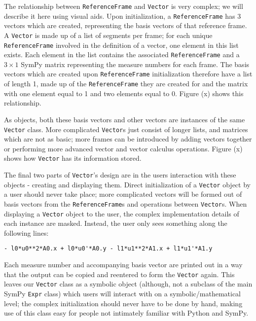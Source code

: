\documentclass[twocolumn,10pt]{asme2e}
\begin{document}
The relationship between \verb|ReferenceFrame| and \verb|Vector| is very
complex; we will describe it here using visual aids.
Upon initialization, a \verb|ReferenceFrame| has 3 vectors which are created,
representing the basis vectors of that reference frame.
A \verb|Vector| is made up of a list of segments per frame; for each unique
\verb|ReferenceFrame| involved in the definition of a vector, one element in
this list exists.
Each element in the list contains the associated \verb|ReferenceFrame| and a
$3\times1$ SymPy matrix representing the measure numbers for each frame.
The basis vectors which are created upon \verb|ReferenceFrame| initialization
therefore have a list of length 1, made up of the \verb|ReferenceFrame| they
are created for and the matrix with one element equal to 1 and two elements
equal to 0. Figure (x) shows this relationship.

As objects, both these basis vectors and other vectors are instances of the
same \verb|Vector| class.
More complicated \verb|Vector|s just consist of longer lists, and matrices
which are not as basic; more frames can be introduced by adding vectors
together or performing more advanced vector and vector calculus operations.
Figure (x) shows how \verb|Vector| has its information stored.

The final two parts of \verb|Vector|'s design are in the users interaction with
these objects - creating and displaying them.
Direct initialization of a \verb|Vector| object by a user should never take
place; more complicated vectors will be formed out of basis vectors from the
\verb|ReferenceFrame|s and operations between \verb|Vector|s.
When displaying a \verb|Vector| object to the user, the complex implementation
details of each instance are masked.
Instead, the user only sees something along the following lines:
\begin{verbatim}
- l0*u0**2*A0.x + l0*u0'*A0.y - l1*u1**2*A1.x + l1*u1'*A1.y
\end{verbatim}
Each measure number and accompanying basis vector are printed out in a way that
the output can be copied and reentered to form the \verb|Vector| again.
This leaves our \verb|Vector| class as a symbolic object (although, not a
subclass of the main SymPy \verb|Expr| class) which users will interact with on
a symbolic/mathematical level; the complex initialization should never have to
be done by hand, making use of this class easy for people not intimately
familiar with Python and SymPy.
\end{document}
